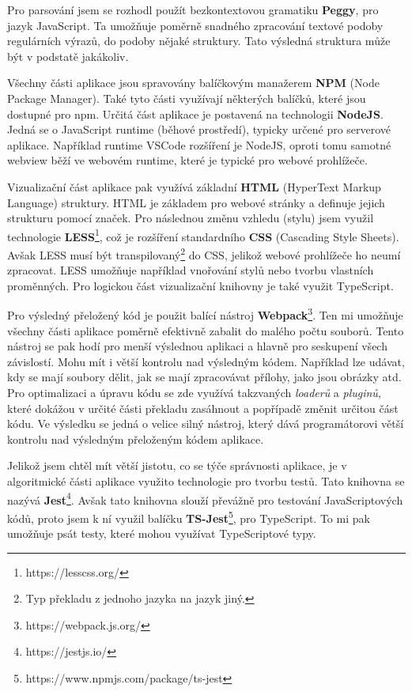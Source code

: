 Pro parsování jsem se rozhodl použít bezkontextovou gramatiku \textbf{Peggy}\cite{Peggy, Peggyjs}, pro jazyk JavaScript.
Ta umožňuje poměrně snadného zpracování textové podoby regulárních výrazů, do podoby nějaké struktury.
Tato výsledná struktura může být v podstatě jakákoliv.

Všechny části aplikace jsou spravovány balíčkovým manažerem \textbf{NPM} (Node Package Manager).
Také tyto části využívají některých balíčků, které jsou dostupné pro npm. 
Určitá část aplikace je postavená na technologii \textbf{NodeJS}.
Jedná se o JavaScript runtime (běhové prostředí), typicky určené pro serverové aplikace. 
Například runtime VSCode rozšíření je NodeJS, oproti tomu samotné webview běží ve webovém runtime, které je typické pro webové prohlížeče.

Vizualizační část aplikace pak využívá základní \textbf{HTML} (HyperText Markup Language) struktury.  
HTML je základem pro webové stránky a definuje jejich strukturu pomocí značek.
Pro následnou změnu vzhledu (stylu) jsem využil technologie \textbf{LESS}\footnote{https://lesscss.org/}, což je rozšíření standardního \textbf{CSS} (Cascading Style Sheets).
Avšak LESS musí být transpilovaný\footnote{Typ překladu z jednoho jazyka na jazyk jiný.} do CSS, jelikož webové prohlížeče ho neumí zpracovat. 
LESS umožňuje například vnořování stylů nebo tvorbu vlastních proměnných.
Pro logickou část vizualizační knihovny je také využit TypeScript.

Pro výsledný přeložený kód je použit balící nástroj \textbf{Webpack}\footnote{https://webpack.js.org/}.
Ten mi umožňuje všechny části aplikace poměrně efektivně zabalit do malého počtu souborů. 
Tento nástroj se pak hodí pro menší výslednou aplikaci a hlavně pro seskupení všech závislostí.
Mohu mít i větší kontrolu nad výsledným kódem.
Například lze udávat, kdy se mají soubory dělit, jak se mají zpracovávat přílohy, jako jsou obrázky atd.
Pro optimalizaci a úpravu kódu se zde využívá takzvaných \textit{loaderů} a \textit{pluginů}, 
které dokážou v určité části překladu zasáhnout a popřípadě změnit určitou část kódu.
Ve výsledku se jedná o velice silný nástroj, který dává programátorovi větší kontrolu nad výsledným přeloženým kódem aplikace.

Jelikož jsem chtěl mít větší jistotu, co se týče správnosti aplikace, je v algoritmické části aplikace využito technologie pro tvorbu testů. 
Tato knihovna se nazývá \textbf{Jest}\footnote{https://jestjs.io/}.
Avšak tato knihovna slouží převážně pro testování JavaScriptových kódů, proto jsem k ní využil balíčku \textbf{TS-Jest}\footnote{https://www.npmjs.com/package/ts-jest}, pro TypeScript.
To mi pak umožňuje psát testy, které mohou využívat TypeScriptové typy.


